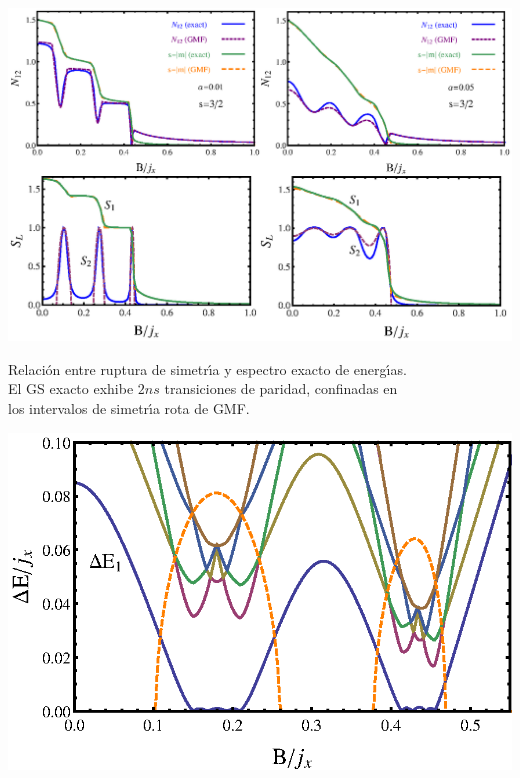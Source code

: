 \documentclass[a0paper,portrait]{baposter}
\begin{document}
\begin{poster}
{\hspace*{5.8cm}\includegraphics*[scale=.4]{fig6}
\vspace*{-4.45cm}

\vspace*{0.5cm}

\begin{minipage}{10.5cm} Relaci\'on entre ruptura de simetr\'{\i}a y espectro exacto de energ\'{\i}as.\\ El GS exacto exhibe {\color{magenta} $2ns$} transiciones de paridad,
confinadas en\\ los intervalos de simetr\'{\i}a rota de GMF.
\end{minipage}
 \vspace*{-8.25cm}

\hspace*{10.4cm} \includegraphics*[scale=.3]{fig4}\hspace*{-3cm}
\vspace*{-.25cm}

}
\end{poster}
\end{document}
